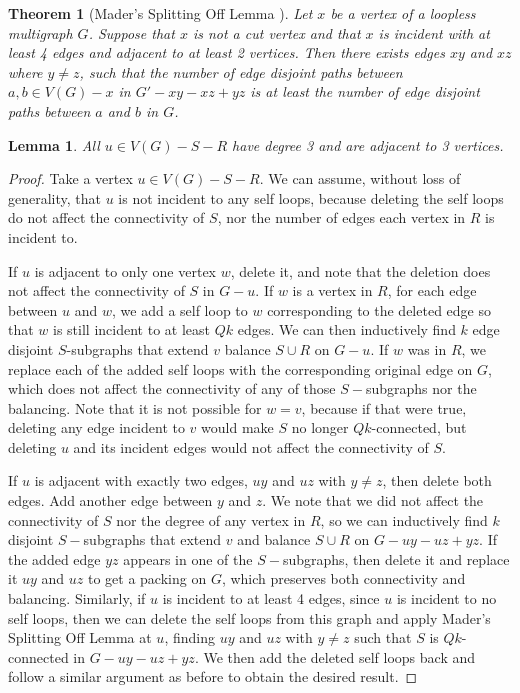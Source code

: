 \documentclass{article}
\newtheorem{lemma}{Lemma}[section]
\newtheorem{theorem}{Theorem}[section]
\begin{document}
\begin{theorem}[Mader's Splitting Off Lemma \cite{Mader}]
    Let $x$ be a vertex of a loopless multigraph $G$. Suppose that $x$ is not a cut vertex and that $x$ is incident with at least 4 edges and adjacent to at least 2 vertices. Then there exists edges $xy$ and $xz$ where $y \not= z$, such that the number of edge disjoint paths between $a,b \in V(G)-x$ in $G'-xy-xz+yz$ is at least the number of edge disjoint paths between $a$ and $b$ in $G$.
\end{theorem}

\begin{lemma}
    All $ u\in V(G)-S-R$ have degree 3 and are adjacent to 3 vertices. 
\end{lemma}

\begin{proof}

    Take a vertex $u \in V(G)-S-R$. We can assume, without loss of generality, that $u$ is not incident to any self loops, because deleting the self loops do not affect the connectivity of $S$, nor the number of edges each vertex in $R$ is incident to. 
    
    If $u$ is adjacent to only one vertex $w$, delete it, and note that the deletion does not affect the connectivity of $S$ in $G-u$. If $w$ is a vertex in $R$, for each edge between $u$ and $w$, we add a self loop to $w$ corresponding to the deleted edge so that $w$ is still incident to at least $Qk$ edges. We can then inductively find $k$ edge disjoint $S$-subgraphs that extend $v$ balance $S \cup R$ on $G-u$. If $w$ was in $R$, we replace each of the added self loops with the corresponding original edge on $G$, which does not affect the connectivity of any of those $S-$subgraphs nor the balancing. Note that it is not possible for $w = v$, because if that were true, deleting any edge incident to $v$ would make $S$ no longer $Qk$-connected, but deleting $u$ and its incident edges would not affect the connectivity of $S$.  

    If $u$ is adjacent with exactly two edges, $uy$ and $uz$ with $y \not= z$, then delete both edges. Add another edge between $y$ and $z$. We note that we did not affect the connectivity of $S$ nor the degree of any vertex in $R$, so we can inductively find $k$ disjoint $S-$subgraphs that extend $v$ and balance $S \cup R$ on $G-uy-uz+yz$. If the added edge $yz$ appears in one of the $S-$subgraphs, then delete it and replace it $uy$ and $uz$ to get a packing on $G$, which preserves both connectivity and balancing. Similarly, if $u$ is incident to at least 4 edges, since $u$ is incident to no self loops, then we can delete the self loops from this graph and apply Mader's Splitting Off Lemma at $u$, finding $uy$ and $uz$ with $y \not= z$ such that $S$ is $Qk$-connected in $G-uy-uz+yz$. We then add the deleted self loops back and follow a similar argument as before to obtain the desired result.  


\end{proof}
\end{document}

